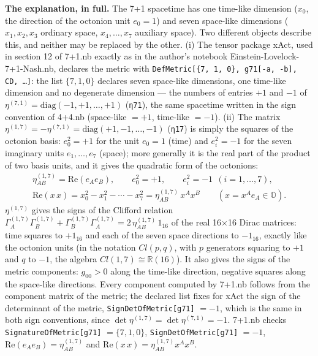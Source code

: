 \documentclass[10pt,a4paper]{article}
\begin{document}
\textbf{The explanation, in full.} The 7+1 spacetime has one time-like dimension ($x_0$, the direction of the octonion unit $e_0=1$) and seven space-like dimensions ($x_1,x_2,x_3$ ordinary space, $x_4,\dots,x_7$ auxiliary space). Two different objects describe this, and neither may be replaced by the other. (i) The tensor package xAct, used in section 12 of 7+1.nb exactly as in the author’s notebook Einstein-Lovelock-7+1-Nash.nb, declares the metric with \texttt{DefMetric[\{7, 1, 0\}, g71[-a, -b], CD, …]}: the list $\{7,1,0\}$ declares seven space-like dimensions, one time-like dimension and no degenerate dimension — the numbers of entries $+1$ and $-1$ of $\eta^{(7,1)}=\mathrm{diag}(-1,+1,\dots,+1)$ (\texttt{η71}), the same spacetime written in the sign convention of 4+4.nb (space-like $=+1$, time-like $=-1$). (ii) The matrix $\eta^{(1,7)}=-\eta^{(7,1)}=\mathrm{diag}(+1,-1,\dots,-1)$ (\texttt{η17}) is simply the squares of the octonion basis: $e_0^2=+1$ for the unit $e_0=1$ (time) and $e_i^2=-1$ for the seven imaginary units $e_1,\dots,e_7$ (space); more generally it is the real part of the product of two basis units, and it gives the quadratic form of the octonions:
\begin{gather*}
\eta^{(1,7)}_{AB}=\mathrm{Re}(e_Ae_B),\qquad e_0^2=+1,\qquad e_i^2=-1\ \ (i=1,\dots,7),\\ \mathrm{Re}(x\,x)=x_0^2-x_1^2-\cdots-x_7^2=\eta^{(1,7)}_{AB}\,x^Ax^B\qquad (x=x^Ae_A\in\mathbb O).
\end{gather*}
$\eta^{(1,7)}$ gives the signs of the Clifford relation $\Gamma^{(1,7)}_A\Gamma^{(1,7)}_B+\Gamma^{(1,7)}_B\Gamma^{(1,7)}_A=2\,\eta^{(1,7)}_{AB}\,1_{16}$ of the real 16×16 Dirac matrices: time squares to $+1_{16}$ and each of the seven space directions to $-1_{16}$, exactly like the octonion units (in the notation $Cl(p,q)$, with $p$ generators squaring to $+1$ and $q$ to $-1$, the algebra $Cl(1,7)\cong\mathbb R(16)$). It also gives the signs of the metric components: $g_{00}>0$ along the time-like direction, negative squares along the space-like directions. Every component computed by 7+1.nb follows from the component matrix of the metric; the declared list fixes for xAct the sign of the determinant of the metric, \texttt{SignDetOfMetric[g71]} $=-1$, which is the same in both sign conventions, since $\det \eta^{(1,7)}=\det \eta^{(7,1)}=-1$. 7+1.nb checks \texttt{SignatureOfMetric[g71]} $=\{7,1,0\}$, \texttt{SignDetOfMetric[g71]} $=-1$, $\mathrm{Re}(e_Ae_B)=\eta^{(1,7)}_{AB}$ and $\mathrm{Re}(x\,x)=\eta^{(1,7)}_{AB}x^Ax^B$.
\end{document}
